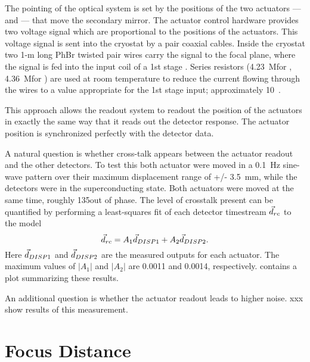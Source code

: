 The pointing of the optical system is set by the positions of the two actuators ---  and  --- that move the secondary mirror.
The actuator control hardware provides two voltage signal which are proportional to the positions of the actuators.
This voltage signal is sent into the \Imager cryostat by a pair coaxial cables.
Inside the cryostat two 1-m long PhBr  twisted pair wires carry the signal to the focal plane, where the signal is fed into the input coil of a 1st stage \SQUID.
Series resistors (4.23~M\Ohm for , 4.36~M\Ohm for ) are used at room temperature to reduce the current flowing through the wires to a value appropriate for the 1st stage \SQUID input; approximately 10~\uA.

This approach allows the readout system to readout the position of the actuators in exactly the same way that it reads out the detector response.
The actuator position is synchronized perfectly with the detector data.

A natural question is whether cross-talk appears between the actuator readout and the other detectors.
To test this both actuator were moved in a 0.1~Hz sine-wave pattern over their maximum displacement range of +/- 3.5~mm, while the detectors were in the superconducting state.
Both actuators were moved at the same time, roughly 135\textdegree out of phase.
The level of crosstalk present can be quantified by performing a least-squares fit of each detector timestream $\vec{d}_{rc}$ to the model
\[
	 \vec{d}_{rc} = A_1 \vec{d}_{{\small DISP{1}}} + A_2 \vec{d}_{{\small DISP{2}}}.
\]
Here $\vec{d}_{{\small DISP{1}}}$ and $\vec{d}_{{\small DISP{2}}}$ are the measured outputs for each actuator.
The maximum values of $|A_1|$  and $|A_2|$ are 0.0011 and 0.0014, respectively.
 contains a plot summarizing these results.

An additional question is whether the actuator readout leads to higher noise.
xxx show results of this measurement.


\section{Focus Distance}\label{s:focus-distance}

